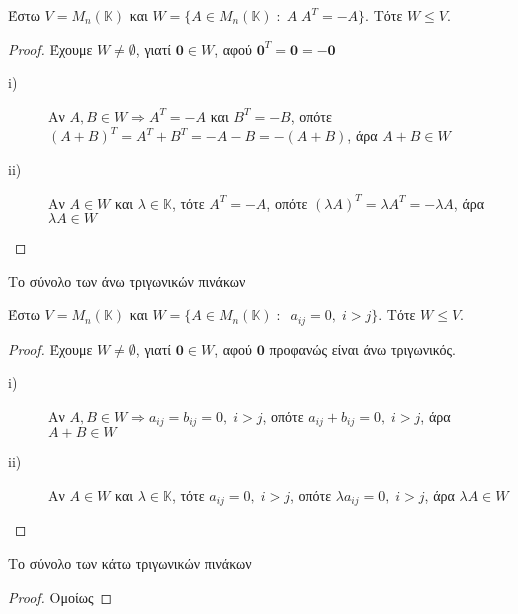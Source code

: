 \begin{examples}
\begin{enumerate}
            Έστω $ V = M_{n}(\mathbb{K}) $ και $ W = \{ A \in M_{n}(\mathbb{K}) \;
            : \; A \; A^{T}=-A \}  $. Τότε $ W \leq V $.
            \begin{proof}
            \item {}
                Έχουμε $ W \neq \emptyset $, γιατί $ \mathbf{0} \in W $, αφού 
                $ \mathbf{0}^{T}= \mathbf{0} = - \mathbf{0} $
                \begin{description}
                    \item [i)]
                        Αν $ A, B \in W \Rightarrow A^{T}=-A $ και $ B^{T}=-B $, οπότε
                        $ (A+B)^{T}= A^{T}+B^{T}=-A-B = - (A+B) $, άρα $A+B \in W$
                    \item[ii)] Αν $ A \in W $ και $ \lambda \in \mathbb{K} $, τότε 
                        $A^{T}=-A$, οπότε $(\lambda A)^{T} = \lambda A^{T} =
                        -\lambda A  $, άρα $ \lambda A \in W $
                \end{description}
            \end{proof}

        \item \textcolor{Col2}{Το σύνολο των άνω τριγωνικών πινάκων}

            Έστω $ V = M_{n}(\mathbb{K}) $ και $ W = \{ A \in M_{n}(\mathbb{K}) \;
            : \; \; a_{ij} = 0, \; i>j \}  $. Τότε $ W \leq V $.

            \begin{proof}
            \item {}
                Έχουμε $ W \neq \emptyset $, γιατί $ \mathbf{0} \in W $, αφού 
                $ \mathbf{0} $ προφανώς είναι άνω τριγωνικός.
                \begin{description}
                    \item [i)]
                        Αν $ A, B \in W \Rightarrow a_{ij} = b_{ij} = 0, \; i>j$, οπότε
                        $a_{ij} + b_{ij} = 0, \; i>j$, άρα $A+B \in W$
                    \item[ii)] Αν $ A \in W $ και $ \lambda \in \mathbb{K} $, τότε 
                        $a_{ij} = 0, \; i>j$, οπότε $ \lambda a_{ij} = 0, \; i>j$, 
                        άρα $ \lambda A \in W $
                \end{description}
            \end{proof}

        \item \textcolor{Col2}{Το σύνολο των κάτω τριγωνικών πινάκων}
            \begin{proof}
                Ομοίως
            \end{proof}


\end{enumerate}
\end{examples}
